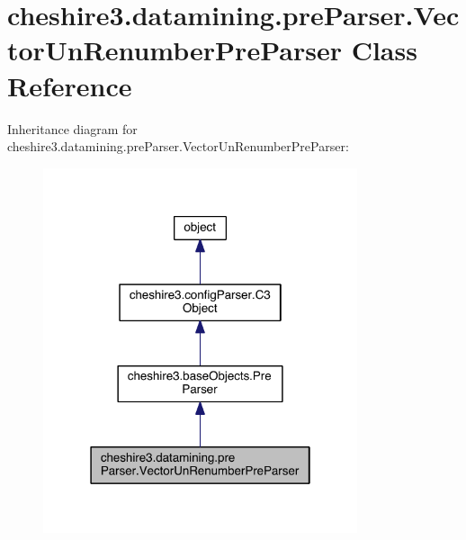 \hypertarget{classcheshire3_1_1datamining_1_1pre_parser_1_1_vector_un_renumber_pre_parser}{\section{cheshire3.\-datamining.\-pre\-Parser.\-Vector\-Un\-Renumber\-Pre\-Parser Class Reference}
\label{classcheshire3_1_1datamining_1_1pre_parser_1_1_vector_un_renumber_pre_parser}
}


Inheritance diagram for cheshire3.\-datamining.\-pre\-Parser.\-Vector\-Un\-Renumber\-Pre\-Parser\-:
\nopagebreak
\begin{figure}[H]
\begin{center}
\leavevmode
\includegraphics[width=262pt]{classcheshire3_1_1datamining_1_1pre_parser_1_1_vector_un_renumber_pre_parser__inherit__graph}
\end{center}
\end{figure}


